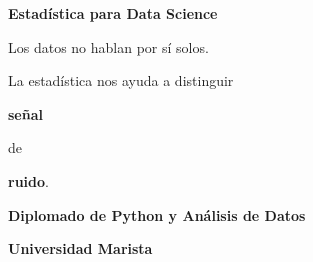 \documentclass[aspectratio=169,11pt]{beamer}
\begin{document}
\begin{frame}

\begin{center}

{\Huge
\textcolor{azulmarista}{
\textbf{Estadística para Data Science}
}
}

\vspace{0.8cm}

{\Large
Los datos no hablan por sí solos.
}

\vspace{0.4cm}

{\Large
La estadística nos ayuda a distinguir
}

\vspace{0.3cm}

{\LARGE
\textbf{señal}
}

\vspace{0.1cm}

de

\vspace{0.1cm}

{\LARGE
\textbf{ruido}.
}

\vspace{0.8cm}

\textbf{Diplomado de Python y Análisis de Datos}

\vspace{0.2cm}

\textbf{Universidad Marista}

\end{center}

\end{frame}

\end{document}
